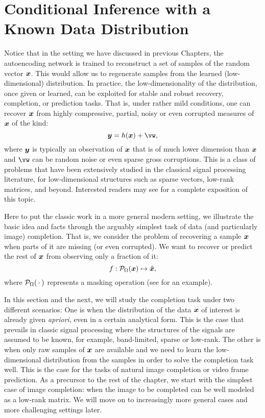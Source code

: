 \documentclass[../../book-main.tex]{subfiles}
\begin{document}
\section{Conditional Inference with a Known Data Distribution}
Notice that in the setting we have discussed in previous Chapters, the
autoencoding network is trained to reconstruct a set of samples of the random vector $\bm{x}$. This would allow us to regenerate samples from  the learned (low-dimensional) distribution. In practice, the low-dimensionality of the distribution, once given or learned, can be exploited for stable and robust recovery, completion, or prediction tasks. That is, under rather mild conditions, one can recover $\bm{x}$ from highly compressive, partial, noisy or even corrupted measures of $\bm{x}$ of the kind:
\begin{equation}
    \y = h(\x) + \vw,
\end{equation}
where $\bm{y}$ is typically an observation of $\bm{x}$ that is of much lower dimension than $\bm{x}$ and $\vw$ can be random noise or even sparse gross corruptions. This is a class of problems that have been extensively studied in the classical signal processing literature, for low-dimensional structures such as sparse vectors, low-rank matrices, and beyond. Interested readers may see \cite{Wright-Ma-2022} for a complete exposition of this topic.

Here to put the classic work in a more general modern setting, we illustrate the basic idea and facts through the arguably simplest task of data (and particularly image) completion. That is, we consider the problem of recovering a sample $\bm{x}$ when parts of it are missing (or even corrupted). We want to recover or predict the rest of $\bm{x}$
from observing only a fraction of it:
\begin{equation}
f: \mathcal{P}_{\Omega}(\bm{x}) \mapsto \hat{\bm{x}},
\end{equation}
where $\mathcal{P}_{\Omega}(\,\cdot\,)$ represents a masking operation
(see  for an example).

In this section and the next, we will study the completion task under two different scenarios: One is when the distribution of the data $\bm{x}$ of interest is already given {\em apriori}, even in a certain analytical form. This is the case that prevails in classic signal processing where the structures of the signals are assumed to be known, for example,  band-limited, sparse or low-rank. The other is when only raw samples of $\bm{x}$ are available and we need to learn the low-dimensional distribution from the samples in order to solve the completion task well. This is the case for the tasks of natural image completion or video frame prediction. As a precursor to the rest of the chapter, we start with the simplest case of image completion: when the image to be completed can be well modeled as a low-rank matrix. We will move on to increasingly more general cases and more challenging settings later.
\end{document}
